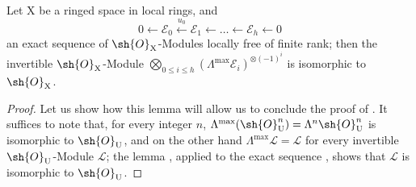 \begin{lemma}[21.11.2]
\label{IV.21.11.2}
Let $\mathrm{X}$ be a ringed space in local rings, and
\[
  0\leftarrow\mathscr{E}_0\xleftarrow{u_0}\mathscr{E}_1\leftarrow\ldots\leftarrow\mathscr{E}_h\leftarrow 0
\]
an exact sequence of $\sh{O}_{\mathrm{X}}$-Modules locally free of finite rank; then the invertible $\sh{O}_{\mathrm{X}}$-Module $\bigotimes_{0\leq i\leq h}(\Lambda^{\max}\mathscr{E}_i)^{\otimes(-1)^i}$ is isomorphic to $\sh{O}_{\mathrm{X}}$.
\end{lemma}

\begin{proof}
Let us show how this lemma will allow us to conclude the proof of .
It suffices to note that, for every integer $n$, $\Lambda^{\max}(\sh{O}_{\mathrm{U}}^n)=\Lambda^n\sh{O}_{\mathrm{U}}^n$ is isomorphic to $\sh{O}_{\mathrm{U}}$, and on the other hand $\Lambda^{\max}\mathscr{L}=\mathscr{L}$ for every invertible $\sh{O}_{\mathrm{U}}$-Module $\mathscr{L}$; the lemma , applied to the exact sequence , shows that $\mathscr{L}$ is isomorphic to $\sh{O}_{\mathrm{U}}$.


\end{proof}
